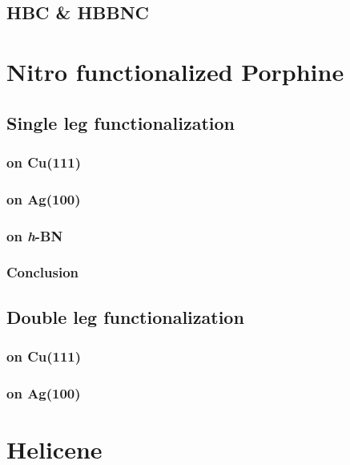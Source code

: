 \documentclass[
twoside,				%
BCOR=8mm,				%
headings=normal,		%
headsepline,			%
footsepline,			%
plainfootsepline,		%
]{scrbook}
\begin{document}
\section{HBC \& HBBNC}

\chapter{Nitro functionalized Porphine}
    
  \section{Single leg functionalization}
   \subsection{on Cu(111)}
      
   \subsection{on Ag(100)}
      
   \subsection{on \textit{h}-BN}
      
	\subsection{Conclusion}
      

  \section{Double leg functionalization}
   \subsection{on Cu(111)}
      
   \subsection{on Ag(100)}
      
\chapter{Helicene}
\end{document}
